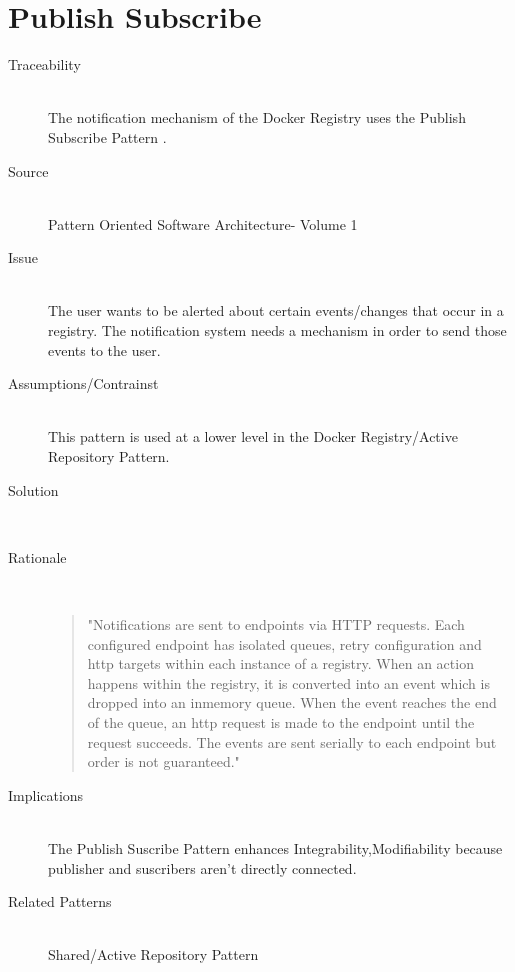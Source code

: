 \section{Publish Subscribe}
\begin{description}

\item[Traceability]~\\
The notification mechanism of the Docker Registry uses the Publish Subscribe Pattern \cite{docknotif}.

\item[Source]~\\
Pattern Oriented Software Architecture- Volume 1

\item[Issue]~\\ The user wants to be alerted about certain events/changes that occur in a registry.
The notification system needs a mechanism in order to send those events to the user.

\item[Assumptions/Contrainst]~\\ 
This pattern is used at a lower level in the Docker Registry/Active Repository Pattern.



\item[Solution]~\\

\item[Rationale]~\\ 


\begin{quote}
"Notifications are sent to endpoints via HTTP requests. Each configured endpoint has isolated queues, retry configuration and http targets within each instance of a registry. When an action happens within the registry, it is converted into an event which is dropped into an inmemory queue. When the event reaches the end of the queue, an http request is made to the endpoint until the request succeeds. The events are sent serially to each endpoint but order is not guaranteed."%
\end{quote} 

\item[Implications]~\\ %
The Publish Suscribe Pattern enhances Integrability,Modifiability because publisher and suscribers aren't directly connected.%

\item [Related Patterns]~\\
Shared/Active Repository Pattern


\end{description}

